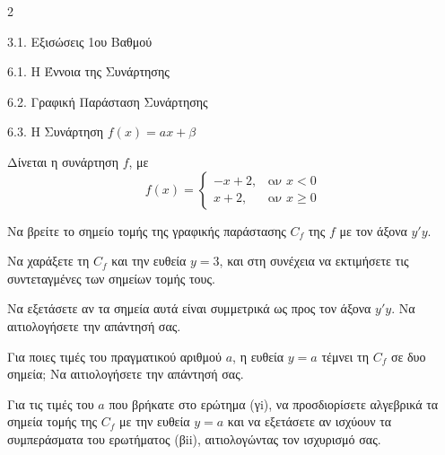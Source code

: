 \begin{ylh}{2}
    \item 3.1. Εξισώσεις 1ου Βαθμού
    \item 6.1. Η Έννοια της Συνάρτησης
    \item 6.2. Γραφική Παράσταση Συνάρτησης
    \item 6.3. Η Συνάρτηση $f(x)=ax+\beta$
\end{ylh}
Δίνεται η συνάρτηση $f$, με
\[ f(x) = \begin{cases} -x + 2, & \text{αν } x < 0 \\ x + 2, & \text{αν } x \ge 0 \end{cases} \]
\begin{alist}
\item Να βρείτε το σημείο τομής της γραφικής παράστασης $C_f$ της $f$ με τον άξονα $y'y$.
\begin{rlist}
\item Να χαράξετε τη $C_f$ και την ευθεία $y = 3$, και στη συνέχεια να εκτιμήσετε τις συντεταγμένες των σημείων τομής τους.
\item Nα εξετάσετε αν τα σημεία αυτά είναι συμμετρικά ως προς τον άξονα $y'y$. Να αιτιολογήσετε την απάντησή σας.
\end{rlist}
\item
\begin{rlist}
\item Για ποιες τιμές του πραγματικού αριθμού $a$, η ευθεία $y = a$ τέμνει τη $C_f$ σε δυο σημεία; Να αιτιολογήσετε την απάντησή σας.
\item Για τις τιμές του $a$ που βρήκατε στο ερώτημα (γi), να προσδιορίσετε αλγεβρικά τα σημεία τομής της $C_f$ με την ευθεία $y = a$ και να εξετάσετε αν ισχύουν τα συμπεράσματα του ερωτήματος (βii), αιτιολογώντας τον ισχυρισμό σας.
\end{rlist}
\end{alist}

